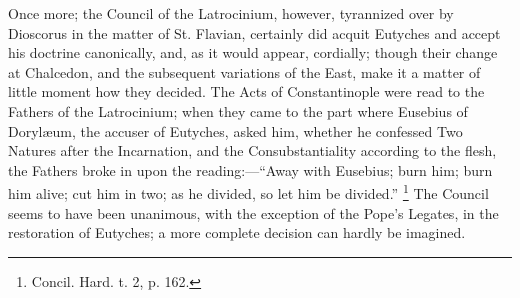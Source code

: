 Once more; the Council of the Latrocinium, however, tyrannized over
by Dioscorus in the matter of St. Flavian, certainly did acquit
Eutyches and accept his doctrine canonically, and, as it would appear,
cordially; though their change at Chalcedon, and the subsequent
variations of the East, make it a matter of little moment how they
decided. The Acts of Constantinople were read to the Fathers of the
Latrocinium; when they came to the part where Eusebius of Dorylæum,
the accuser of Eutyches, asked him, whether he confessed Two Natures
after the Incarnation, and the Consubstantiality according to the
flesh, the Fathers broke in upon the reading:—``Away with
Eusebius; burn him; burn him alive; cut him in two; as he divided, so
let him be divided.'' \footnote{Concil. Hard. t. 2, p. 162.}
The Council seems to have been unanimous, with the exception of the
Pope's Legates, in the restoration of Eutyches; a more complete
decision can hardly be imagined.

